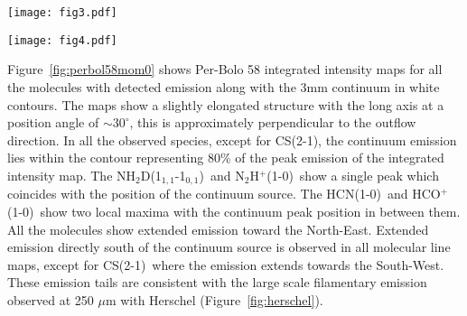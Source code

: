 \documentclass[iop]{emulateapj}
\newcommand{\nhtd}{\mbox{\rm NH$_2$D(1$_{1,1}$-1$_{0,1}$)}}
\newcommand{\nthp}{\mbox{\rm N$_2$H$^+$(1-0)}}
\newcommand{\hcn}{\mbox{\rm HCN(1-0)}}
\newcommand{\hcop}{\mbox{\rm  HCO$^+$(1-0)}}
\newcommand{\cs}{\mbox{\rm CS(2-1)}}
\begin{document}
\begin{figure*}
   \center
   \texttt{[image: fig3.pdf]}
   \caption{Molecular line spectra at different offsets (in arcseconds) from the continuum peak position. The spectra are averaged over a beam. For the \nhtd\ only the central three hyperfine lines are shown, for the \nthp\ and \hcn\ the line that is shown corresponds to the isolated and weakest hyperfine line, respectively, and therefore these hyperfine are shifted in velocity in this figure. The blue and red regions correspond to the velocity ranges used for the blue and red integrated intensity maps shown in Figure~\ref{fig:mom0percomp}.
   \label{fig:specmap}}
\end{figure*}


\begin{figure*}[t]
\center
\texttt{[image: fig4.pdf]}
\caption{Position-velocity maps for the molecular lines in our sample. The top and bottom row correspond to a cut in a direction perpendicular and parallel to the outflow axis, respectively. Black contours were drawn from 20 to 90 \% (in steps of 10\%) of the maximum intensity value in each panel. Black dashed contours mark regions of $-3\sigma$ values.
\label{fig:perbol58pvmap}}
\end{figure*}





Figure~\ref{fig:perbol58mom0} shows Per-Bolo 58 integrated intensity maps for all the molecules with detected emission along with the 3mm continuum in white contours. The maps show a slightly elongated structure with the long axis at a position angle of  $\sim30^{\circ}$, this is approximately perpendicular to the outflow direction. In all the observed species, except for \cs, the continuum emission lies within the contour representing 80\% of the peak emission of the integrated intensity map. The \nhtd\ and \nthp\ show a single peak which coincides with the position of the continuum source. The \hcn\ and \hcop\ show two local maxima with the continuum peak position in between them. All the molecules show extended emission toward the North-East. Extended emission directly south of the continuum source is observed in all molecular line maps, except for \cs\ where the emission extends towards the South-West. These emission tails are consistent with the large scale filamentary emission observed at 250 $\mu$m with Herschel (Figure~\ref{fig:herschel}).\\
\end{document}

